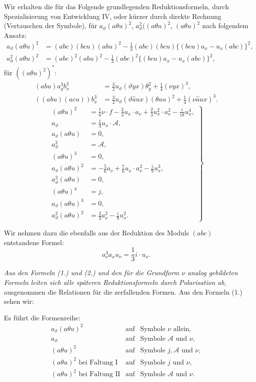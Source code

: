 \documentclass[11pt]{article}
\newcommand{\A}{\mathcal A}
\begin{document}
Wir erhalten die für das Folgende grundlegenden Reduktionsformeln, durch Spezialisierung von Entwicklung IV, oder kürzer durch direkte Rechnung (Vertauschen der Symbole), für $a_\vartheta(a\theta u)^2$, $a_\vartheta^2((a\theta u)^2$, $(a\theta u)^2$ nach folgendem Ansatz:
\[
\begin{aligned}
a_\vartheta(a\theta u)^2
&=(abc)(bcu)(abu)^2-\frac13(abc)(bcu)\{(bcu)a_x-u_x(abc)\}^2,\\
a_\vartheta^2(a\theta u)^2
&=(abc)^2(abu)^2-\frac13(abc)^2\{(bcu)a_x-u_x(abc)\}^2,
\end{aligned}
\]
für $((a\theta u)^2)^{*}$:
\[
\begin{aligned}
(abu)a_y^3b_x^3&=\frac32u_\vartheta(\vartheta yx)\theta_y^2+\frac14(\nu yx)^3,\\
((abu)(acu))b_x^3&=\frac32u_\vartheta(\vartheta\widehat{a}ux)(\theta au)^2+\frac14(\nu\widehat{a}ux)^3.
\end{aligned}
\]
\[
\left.
\begin{aligned}
(a\theta u)^2&=\frac16\nu\cdot f-\frac23u_x\cdot a_\nu
+\frac23u_x^2\cdot a_\nu^2-\frac{i}{18}u_x^4,\\
a_\vartheta&=\frac13u_x\cdot\A,\\
a_\vartheta(a\theta u)&=0,\\
a_\vartheta^2&=\A,\\
(a\theta u)^3&=0,\\
a_\vartheta(a\theta u)^2&=-\frac56a_\nu+\frac76u_x\cdot a_\nu^2-\frac{i}{9}u_x^3,\\
a_\vartheta^2(a\theta u)&=0,\\
(a\theta u)^4&=j,\\
a_\vartheta(a\theta u)^3&=0,\\
a_\vartheta^2(a\theta u)^2&=\frac23a_\nu^2-\frac{i}{9}u_x^2.
\end{aligned}
\right\} \tag{1}
\]

Wir nehmen dazu die ebenfalls aus der Reduktion des Moduls $(abc)$ entstandene Formel:
\[
a_\nu^3a_xu_\nu=\frac13 i\cdot u_x. \tag{2}
\]

\emph{Aus den Formeln (1.) und (2.) und den für die Grundform $\nu$ analog gebildeten Formeln leiten sich alle späteren Reduktionsformeln durch Polarisation ab}, ausgenommen die Relationen für die zerfallenden Formen. Aus den Formeln (1.) sehen wir:

Es führt die Formenreihe:
\[
\begin{array}{rcl}
a_\vartheta(a\theta u)^2 &\text{auf}& \text{Symbole }\nu\text{ allein},\\[0.2em]
a_\vartheta &\text{auf}& \text{Symbole }\A\text{ und }\nu,\\[0.2em]
(a\theta u)^2 &\text{auf}& \text{Symbole }j,\A\text{ und }\nu,\\[0.2em]
(a\theta u)^2\text{ bei Faltung I} &\text{auf}& \text{Symbole }j\text{ und }\nu,\\[0.2em]
(a\theta u)^2\text{ bei Faltung II} &\text{auf}& \text{Symbole }\A\text{ und }\nu.
\end{array}
\]
\end{document}
